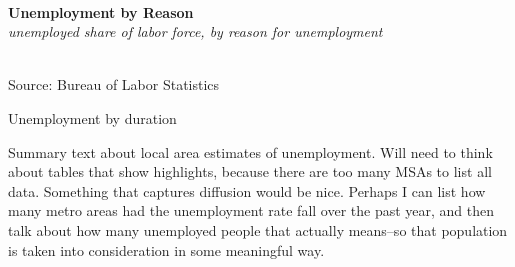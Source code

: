 \documentclass{report}
\makeatletter
\newcommand{\tbllink}[1]{\href{https://raw.githubusercontent.com/bdecon/US-chartbook/master/chartbook/data/#1}{\faTable}}
\newcommand*\short[1]{\expandafter\@gobbletwo\number\numexpr#1\relax}
\newcommand{\sbar}[4]{
		\addplot[ybar stacked, bar width=2.7pt, draw opacity=0, fill=#1] 
			table [x=#2, y=#3, col sep=comma]{#4};}
\newcommand{\dateaxisticks}{
		date coordinates in=x, axis line style={draw=none},
		xmax={2020-02-01},
		max space between ticks=40,	    
		xtick={{1990-01-01}, {1992-01-01}, {1994-01-01}, 
			{1996-01-01}, {1998-01-01}, {2000-01-01}, 
			{2002-01-01}, {2004-01-01}, {2006-01-01},
			{2008-01-01}, {2010-01-01}, {2012-01-01}, {2014-01-01},
		    {2016-01-01}, {2018-01-01}, {2020-01-01}},
		minor xtick={{1989-01-01}, {1991-01-01}, {1993-01-01},
			{1995-01-01}, {1997-01-01}, {1999-01-01}, 
			{2001-01-01}, {2003-01-01}, {2005-01-01}, {2007-01-01},
		    {2009-01-01}, {2011-01-01}, {2013-01-01}, {2015-01-01},
		    {2017-01-01}, {2019-01-01}},
		enlarge y limits={0.06}, enlarge x limits={0.01},
		}
\newcommand{\bbar}[2]{extra #1 ticks = {{#2}}, extra #1 tick labels = ,
		extra #1 tick style = {grid=major, grid style={thick, black!25}},}
\newcommand{\rbars}{
		\fill[color=black!10] (axis cs:{1990-07-01},\pgfkeysvalueof{/pgfplots/ymin}) rectangle 
			(axis cs:{1991-03-01}, \pgfkeysvalueof{/pgfplots/ymax});
		\fill[color=black!10] (axis cs:{2007-12-01},\pgfkeysvalueof{/pgfplots/ymin}) rectangle 
			(axis cs:{2009-07-01}, \pgfkeysvalueof{/pgfplots/ymax});
		\fill[color=black!10] (axis cs:{2001-03-01},\pgfkeysvalueof{/pgfplots/ymin}) rectangle 
			(axis cs:{2001-11-01}, \pgfkeysvalueof{/pgfplots/ymax});}
\makeatother
\begin{document}
{{{{\begin{minipage}{0.76\textwidth}
 \\

\vspace{1mm}

\noindent \normalsize \textbf{Unemployment by Reason}\\
\footnotesize{\textit{unemployed share of labor force, by reason for unemployment}}\\
\noindent \hspace*{-3mm} \\
\footnotesize{Source: Bureau of Labor Statistics} \hfill \tbllink{unemp_reason.csv}

\end{minipage}


\newpage

\vspace{4mm}

\normalsize

Unemployment by duration \\

\vspace{4mm}

\begin{minipage}{0.76\textwidth}

\small Summary text about local area estimates of unemployment. Will need to think about tables that show highlights, because there are too many MSAs to list all data. Something that captures diffusion would be nice. Perhaps I can list how many metro areas had the unemployment rate fall over the past year, and then talk about how many unemployed people that actually means--so that population is taken into consideration in some meaningful way.\\

\vspace{2mm}


\end{minipage}}}}}
\end{document}
